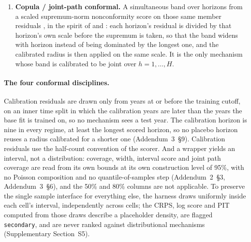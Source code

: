 \begin{enumerate}
  algorithm:
  \begin{enumerate}
  \item $K=10$ members are fit on \emph{nested trailing-block} splits with
    origins one year apart, rather than on interior leave-block-out splits;
    interior blocks would put holes in a panel that random-walk forecasters
    cannot fit.
  \item Residuals are horizon-matched rather than pooled across steps, because
    a five-year-ahead residual and a one-year-ahead residual are not
    exchangeable in a trending panel.
  \item The interval is centred on a full-panel refit rather than on an
    aggregation of the stale members.
  \item There is no online residual update, because the test window is scored
    exactly once.
  \end{enumerate}
  What the member residuals supply, and split conformal lacks, is ten
  realisations of the latent period-effect path per horizon.
\item \textbf{Copula / joint-path conformal.} A simultaneous band over
  horizons from a scaled supremum-norm nonconformity score on those same
  member residuals \citep{diquigiovanni2022conformal}, in the spirit of
  \citet{sun2024copula} and \citet{messoudi2021copula}: each horizon's
  residual is divided by that horizon's own scale before the supremum is
  taken, so that the band widens with horizon instead of being dominated by
  the longest one, and the calibrated radius is then applied on the same
  scale. It is the only mechanism whose band is calibrated to be joint over
  $h=1,\dots,H$.
\end{enumerate}

\paragraph{The four conformal disciplines.} Calibration residuals are drawn
only from years at or before the training cutoff, on an inner time split in
which the calibration years are later than the years the base fit is trained
on, so no mechanism sees a test year. The calibration horizon is nine in every
regime, at least the longest scored horizon, so no placebo horizon reuses a
radius calibrated for a shorter one (Addendum~3~\S9). Calibration residuals
use the half-count convention of the scorer. And a wrapper yields an interval,
not a distribution: coverage, width, interval score and joint path coverage
are read from its own bounds at its own construction level of 95\%, with no
Poisson composition and no quantile-of-samples step (Addendum~2~\S3,
Addendum~3~\S6), and the 50\% and 80\% columns are not applicable. To preserve
the single sample interface for everything else, the harness draws uniformly
inside each cell's interval, independently across cells; the CRPS, log score
and PIT computed from those draws describe a placeholder density, are flagged
\texttt{secondary}, and are never ranked against distributional mechanisms
(Supplementary Section~S5).


